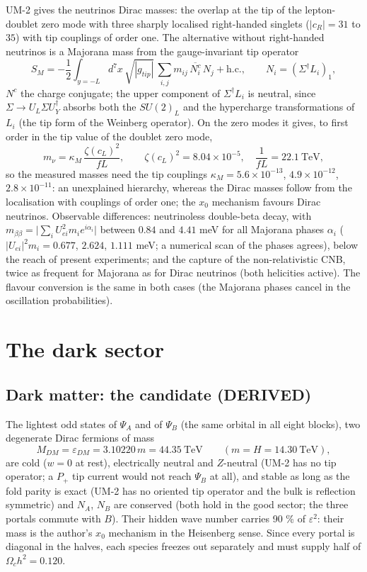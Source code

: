 \documentclass[
  10pt,
]{article}
\begin{document}
UM-2 gives the neutrinos Dirac masses: the overlap at the tip of the
lepton-doublet zero mode with three sharply localised right-handed
singlets (\(|c_R| = 31\) to \(35\)) with tip couplings of order one. The
alternative without right-handed neutrinos is a Majorana mass from the
gauge-invariant tip operator
\[ S_M = -\frac12\int_{y=-L}d^7x\,\sqrt{|g_{tip}|}\,\sum_{i,j}m_{ij}\,\overline{N^c_i}\,N_j + \text{h.c.},\qquad N_i = (\Sigma^\dagger L_i)_1 , \]
\(N^c\) the charge conjugate; the upper component of
\(\Sigma^\dagger L_i\) is neutral, since
\(\Sigma \to U_L\Sigma U_Y^\dagger\) absorbs both the \(SU(2)_L\) and
the hypercharge transformations of \(L_i\) (the tip form of the Weinberg
operator). On the zero modes it gives, to first order in the tip value
of the doublet zero mode,
\[ m_\nu = \kappa_M\,\frac{\zeta(c_L)^2}{fL},\qquad \zeta(c_L)^2 = 8.04\times10^{-5},\quad \frac{1}{fL} = 22.1\ \text{TeV}, \]
so the measured masses need the tip couplings
\(\kappa_M = 5.6\times10^{-13}\), \(4.9\times10^{-12}\),
\(2.8\times10^{-11}\): an unexplained hierarchy, whereas the Dirac
masses follow from the localisation with couplings of order one; the
\(x_0\) mechanism favours Dirac neutrinos. Observable differences:
neutrinoless double-beta decay, with
\(m_{\beta\beta} = \lvert\sum_iU_{ei}^2m_ie^{i\alpha_i}\rvert\) between
\(0.84\) and \(4.41\) meV for all Majorana phases \(\alpha_i\)
(\(\lvert U_{ei}\rvert^2m_i = 0.677\), \(2.624\), \(1.111\) meV; a
numerical scan of the phases agrees), below the reach of present
experiments; and the capture of the non-relativistic CNB, twice as
frequent for Majorana as for Dirac neutrinos (both helicities active).
The flavour conversion is the same in both cases (the Majorana phases
cancel in the oscillation probabilities).

\hypertarget{the-dark-sector}{%
\section{The dark sector}\label{the-dark-sector}}

\hypertarget{dark-matter-the-candidate-derived}{%
\subsection{Dark matter: the candidate
(DERIVED)}\label{dark-matter-the-candidate-derived}}

The lightest odd states of \(\Psi_A\) and of \(\Psi_B\) (the same
orbital in all eight blocks), two degenerate Dirac fermions of mass
\[ M_{DM} = \varepsilon_{DM} = 3.10220\,m = 44.35\ \text{TeV}\qquad (m = H = 14.30\ \text{TeV}), \]
are cold (\(w = 0\) at rest), electrically neutral and \(Z\)-neutral
(UM-2 has no tip operator; a \(P_+\) tip current would not reach
\(\Psi_B\) at all), and stable as long as the fold parity is exact (UM-2
has no oriented tip operator and the bulk is reflection symmetric) and
\(N_A\), \(N_B\) are conserved (both hold in the good sector; the three
portals commute with \(B\)). Their hidden wave number carries 90 \% of
\(\varepsilon^2\): their mass is the author's \(x_0\) mechanism in the
Heisenberg sense. Since every portal is diagonal in the halves, each
species freezes out separately and must supply half of
\(\Omega_ch^2 = 0.120\).
\end{document}
